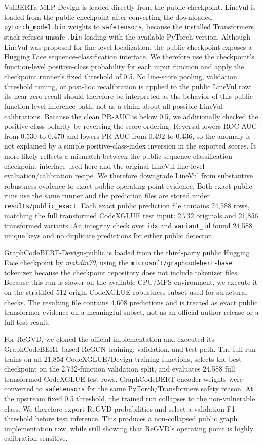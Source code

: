 \documentclass[a4paper,fleqn]{cas-dc}
\begin{document}
VulBERTa-MLP-Devign is loaded directly from the public checkpoint. LineVul is
loaded from the public checkpoint after converting the downloaded
\texttt{pytorch\_model.bin} weights to \texttt{safetensors}, because the
installed Transformers stack refuses unsafe \texttt{.bin} loading with the
available PyTorch version. Although LineVul was proposed for line-level
localization, the public checkpoint exposes a Hugging Face
sequence-classification interface. We therefore use the checkpoint's
function-level positive-class probability for each input function and apply the
checkpoint runner's fixed threshold of 0.5. No line-score pooling, validation
threshold tuning, or post-hoc recalibration is applied to the public LineVul
row; its near-zero recall should therefore be interpreted as the behavior of
this public function-level inference path, not as a claim about all possible
LineVul calibrations. Because the clean PR-AUC is below 0.5, we additionally
checked the positive-class polarity by reversing the score ordering. Reversal
lowers ROC-AUC from 0.530 to 0.470 and lowers PR-AUC from 0.492 to 0.436, so
the anomaly is not explained by a simple positive-class-index inversion in the
exported scores. It more likely reflects a mismatch between the public
sequence-classification checkpoint interface used here and the original
LineVul line-level evaluation/calibration recipe. We therefore downgrade
LineVul from substantive robustness evidence to exact public operating-point
evidence. Both exact public runs use the same runner and the
prediction files are stored under \texttt{results/public\_exact}. Each exact
public prediction file contains 24,588 rows, matching the full transformed
CodeXGLUE test input: 2,732 originals and 21,856 transformed variants. An
integrity check over \texttt{idx} and \texttt{variant\_id} found 24,588 unique
keys and no duplicate predictions for either public detector.

GraphCodeBERT-Devign-public is loaded from the third-party public Hugging Face
checkpoint by \emph{mahdin70}, using the
\texttt{microsoft/graphcodebert-base} tokenizer because the checkpoint
repository does not include tokenizer files. Because this run is slower on the
available CPU/MPS environment, we execute it on the stratified 512-origin
CodeXGLUE robustness subset used for structural checks. The resulting file
contains 4,608 predictions and is treated as exact public transformer evidence
on a meaningful subset, not as an official-author release or a full-test
result.

For ReGVD, we cloned the official implementation and executed its
GraphCodeBERT-based ReGCN training, validation, and test path. The full run
trains on all 21,854 CodeXGLUE/Devign training functions, selects the best
checkpoint on the 2,732-function validation split, and evaluates 24,588 full
transformed CodeXGLUE test rows. GraphCodeBERT encoder weights were converted
to \texttt{safetensors} for the same PyTorch/Transformers safety reason. At the
upstream fixed 0.5 threshold, the trained run collapses to the non-vulnerable
class. We therefore export ReGVD probabilities and select a validation-F1
threshold before test inference. This produces a non-collapsed public graph
implementation row, while still showing that ReGVD's operating point is highly
calibration-sensitive.
\end{document}
